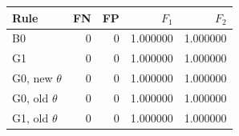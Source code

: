 \begin{tabular}{lrrrr}
\toprule
Rule & FN & FP & $F_1$ & $F_2$ \\
\midrule
B0 & 0 & 0 & 1.000000 & 1.000000 \\
G1 & 0 & 0 & 1.000000 & 1.000000 \\
G0, new $\theta$ & 0 & 0 & 1.000000 & 1.000000 \\
G0, old $\theta$ & 0 & 0 & 1.000000 & 1.000000 \\
G1, old $\theta$ & 0 & 0 & 1.000000 & 1.000000 \\
\bottomrule
\end{tabular}
